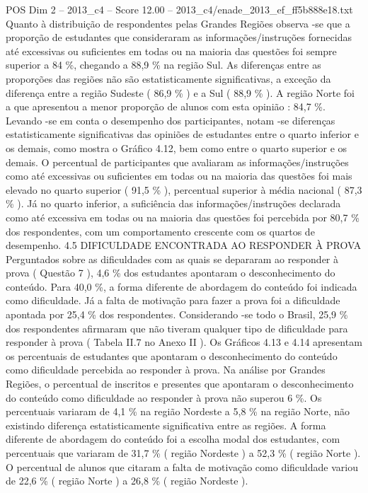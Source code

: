 \begin{textsample}{POS Dim 2 – 2013\_c4 – Score 12.00 – 2013\_c4/enade\_2013\_ef\_ff5b888e18.txt}
Quanto à distribuição de respondentes pelas Grandes Regiões observa -se que a proporção de estudantes que consideraram as informações/instruções fornecidas até excessivas ou suficientes em todas ou na maioria das questões foi sempre superior a 84 \%, chegando a 88,9 \% na região Sul.
As diferenças entre as proporções das regiões não são estatisticamente significativas, a exceção da diferença entre a região Sudeste ( 86,9 \% ) e a Sul ( 88,9 \% ).
A região Norte foi a que apresentou a menor proporção de alunos com esta opinião : 84,7 \%.
Levando -se em conta o desempenho dos participantes, notam -se diferenças estatisticamente significativas das opiniões de estudantes entre o quarto inferior e os demais, como mostra o Gráfico 4.12, bem como entre o quarto superior e os demais.
O percentual de participantes que avaliaram as informações/instruções como até excessivas ou suficientes em todas ou na maioria das questões foi mais elevado no quarto superior ( 91,5 \% ), percentual superior à média nacional ( 87,3 \% ).
Já no quarto inferior, a suficiência das informações/instruções declarada como até excessiva em todas ou na maioria das questões foi percebida por 80,7 \% dos respondentes, com um comportamento crescente com os quartos de desempenho. 4.5 DIFICULDADE ENCONTRADA AO RESPONDER À PROVA Perguntados sobre as dificuldades com as quais se depararam ao responder à prova ( Questão 7 ), 4,6 \% dos estudantes apontaram o desconhecimento do conteúdo.
Para 40,0 \%, a forma diferente de abordagem do conteúdo foi indicada como dificuldade.
Já a falta de motivação para fazer a prova foi a dificuldade apontada por 25,4 \% dos respondentes.
Considerando -se todo o Brasil, 25,9 \% dos respondentes afirmaram que não tiveram qualquer tipo de dificuldade para responder à prova ( Tabela II.7 no Anexo II ).
Os Gráficos 4.13 e 4.14 apresentam os percentuais de estudantes que apontaram o desconhecimento do conteúdo como dificuldade percebida ao responder à prova.
Na análise por Grandes Regiões, o percentual de inscritos e presentes que apontaram o desconhecimento do conteúdo como dificuldade ao responder à prova não superou 6 \%.
Os percentuais variaram de 4,1 \% na região Nordeste a 5,8 \% na região Norte, não existindo diferença estatisticamente significativa entre as regiões.
A forma diferente de abordagem do conteúdo foi a escolha modal dos estudantes, com percentuais que variaram de 31,7 \% ( região Nordeste ) a 52,3 \% ( região Norte ).
O percentual de alunos que citaram a falta de motivação como dificuldade variou de 22,6 \% ( região Norte ) a 26,8 \% ( região Nordeste ).

\end{textsample}

